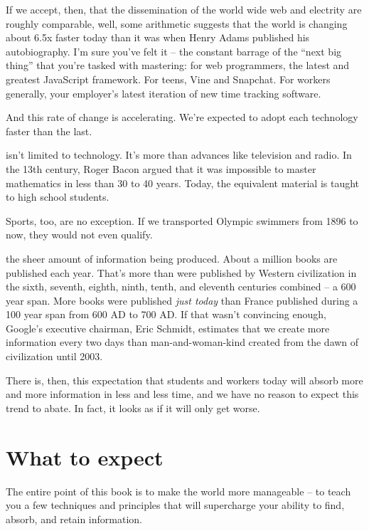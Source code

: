 If we accept, then, that the dissemination of the world wide web and electrity are
roughly comparable, well, some arithmetic suggests that the world is
changing about 6.5x faster today than it was when Henry Adams published his
autobiography. I'm sure you've felt it -- the constant barrage of the
``next big thing'' that you're tasked with mastering: for web programmers, the
latest and greatest JavaScript framework. For teens, Vine and Snapchat. For
workers generally, your employer's latest iteration of new time tracking
software. 

And this rate of change is accelerating. We're expected to adopt each technology faster than the last.

 isn't limited to technology. It's more than
advances like television and radio. In the 13th century, Roger Bacon argued that
it was impossible to master mathematics in less than 30 to 40 years. Today,
the equivalent material is taught to high school students.

Sports, too, are no exception. If we transported Olympic swimmers from 1896 to now, they would not even qualify. \cite{ericsson2006influence}

 the sheer amount of information being produced. About a million books are published each year. That's more than were published
by Western civilization in the sixth, seventh, eighth, ninth, tenth, and
eleventh centuries combined -- a 600 year span. More books were published \textit{just
today} than France published during a 100 year span from 600 AD to 700
AD.\cite{buringh2009charting} If that wasn't convincing enough, Google's
executive chairman, Eric Schmidt, estimates that we create more information
every two days than man-and-woman-kind created from the dawn of civilization until 2003.

There is, then, this expectation that students and workers today will absorb
more and more information in less and less time, and we have no reason to expect
this trend to abate. In fact, it looks as if it will only get worse.

\section{What to expect}

 The entire point of this book is to make the world more manageable -- to teach you a few techniques and principles that will supercharge your ability to find, absorb, and retain information. 

